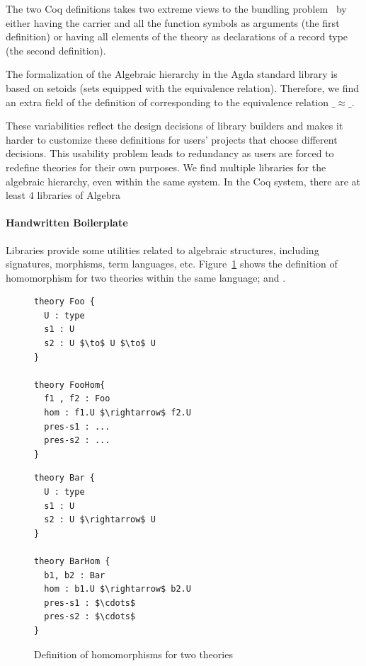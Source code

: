The two Coq definitions takes two extreme views to the bundling problem~\cite{lean2019,alhassy2019,spitters2011type} by either having the carrier and all the function symbols as arguments (the first definition) or having all elements of the theory as declarations of a record type (the second definition). 

The formalization of the Algebraic hierarchy in the Agda standard library is based on setoids (sets equipped with the equivalence relation). Therefore, we find an extra field of the definition of \monoid corresponding to the equivalence relation $\_\approx\_$. 

These variabilities reflect the design decisions of library builders and makes it harder to customize these definitions for users' projects that choose different decisions. This usability problem leads to redundancy as users are forced to redefine theories for their own purposes. We find multiple libraries for the algebraic hierarchy, even within the same system. In the Coq system, there are at least $4$ libraries of Algebra

\paragraph{Handwritten Boilerplate}
Libraries provide some utilities related to algebraic structures, including signatures, morphisms, term languages, etc. 
Figure~\ref{fig:hom-foo-bar} shows the definition of homomorphism for two theories within the same language;  and . 
\begin{figure}
\begin{multicols}{2}
  \begin{lstlisting}[mathescape]
theory Foo { 
  U : type 
  s1 : U 
  s2 : U $\to$ U $\to$ U
}

theory FooHom{
  f1 , f2 : Foo 
  hom : f1.U $\rightarrow$ f2.U 
  pres-s1 : ... 
  pres-s2 : ... 
}
\end{lstlisting}        
\columnbreak
\begin{lstlisting}[mathescape]
theory Bar {
  U : type 
  s1 : U 
  s2 : U $\rightarrow$ U 
}

theory BarHom { 
  b1, b2 : Bar 
  hom : b1.U $\rightarrow$ b2.U 
  pres-s1 : $\cdots$
  pres-s2 : $\cdots$
}
\end{lstlisting}
\end{multicols}    
\caption{Definition of homomorphisms for two theories}
\label{fig:hom-foo-bar}
\end{figure}

